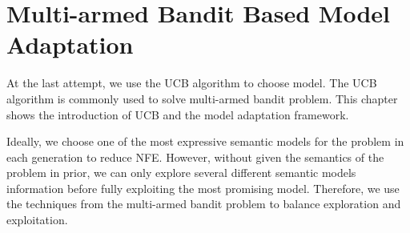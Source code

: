






\section{Multi-armed Bandit Based Model Adaptation}
At the last attempt, we use the UCB algorithm to choose model. The UCB algorithm is commonly used to solve multi-armed bandit problem. This chapter shows the introduction of UCB and the model adaptation framework.

Ideally, we choose one of the most expressive semantic models for the problem in each generation to reduce NFE. However, without given the semantics of the problem in prior, we can only explore several different semantic models information before fully exploiting the most promising model. Therefore, we use the techniques from the multi-armed bandit problem to balance exploration and exploitation.

